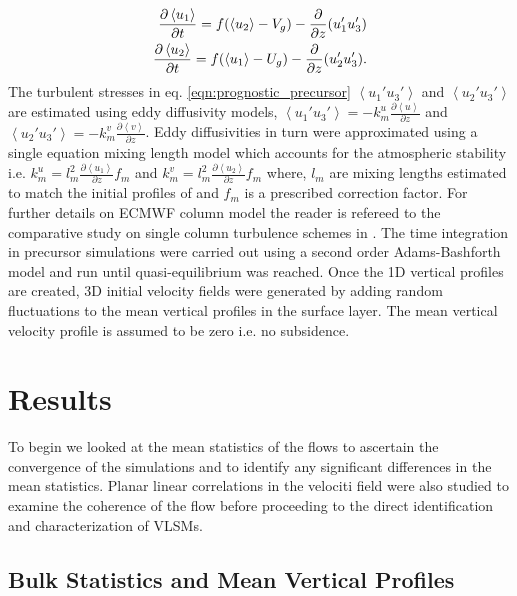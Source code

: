 \documentclass{amsart}
\begin{document}
\begin{align}
\frac{\partial \left < u_{1} \right >}{\partial t}=f(\left < u_{2} \right > - V_g)-\frac{\partial }{\partial z}(u_{1}'u_{3}') \notag \\
\frac{\partial \left < u_{2} \right > }{\partial t}=f(\left < u_{1} \right > - U_g)-\frac{\partial }{\partial z}(u_{2}'u_{3}').
\label{eqn:prognostic_precursor}
\end{align} 
The turbulent stresses in eq. \ref{eqn:prognostic_precursor} $\left < u_{1}'u_{3}' \right >$ and $\left < u_{2}'u_{3}' \right >$ are estimated using eddy diffusivity models, $\left < u_{1}'u_{3}' \right > = -k_{m}^{u}\frac{\partial \left < u \right >}{\partial z}$ and $\left < u_{2}'u_{3}' \right > =-k_m^{v}\frac{\partial \left < v \right >}{\partial z}$. Eddy diffusivities in turn were approximated using a single equation mixing length model which accounts for the atmospheric stability i.e. $k_m^{u} = l_m^2\frac{\partial \left < u_{1} \right >}{\partial z}f_m$ and $k_m^{v} = l_m^2\frac{\partial \left < u_{2}\right >}{\partial z}f_m$ where, $l_m$ are mixing lengths estimated to match the initial profiles of \citet{andren_brown_qjrm_94} and $f_m$ is a prescribed correction factor. For further details on ECMWF column model the reader is refereed to the comparative study on single column turbulence schemes in \citet{cuxart_blm_2006}. The time integration in precursor simulations were carried out using a second order Adams-Bashforth model and run until quasi-equilibrium was reached. Once the 1D vertical profiles are created, 3D initial velocity fields were generated by adding random fluctuations to the mean vertical profiles in the surface layer. The mean vertical velocity profile is assumed to be zero i.e. no subsidence. 

\section{Results}
To begin we looked at the mean statistics of the flows to ascertain the convergence of the simulations and to identify any significant differences in the mean statistics. Planar linear correlations in the velociti field were also studied to examine the coherence of the flow before proceeding to the direct identification and characterization of VLSMs. 
\subsection{Bulk Statistics and Mean Vertical Profiles}
\end{document}
